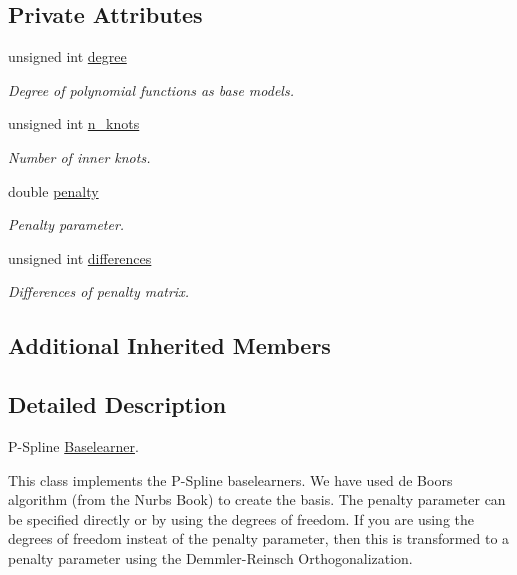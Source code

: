 \subsection*{Private Attributes}
\begin{DoxyCompactItemize}
\item 
unsigned int \hyperlink{classblearner_1_1_p_spline_blearner_a0f01c6609befd8af4d5a44f22293ba55}{degree}
\begin{DoxyCompactList}\small\item\em Degree of polynomial functions as base models. \end{DoxyCompactList}\item 
unsigned int \hyperlink{classblearner_1_1_p_spline_blearner_aac64be7a6b73d4dfc38dd892315ff4be}{n\+\_\+knots}
\begin{DoxyCompactList}\small\item\em Number of inner knots. \end{DoxyCompactList}\item 
double \hyperlink{classblearner_1_1_p_spline_blearner_ac456be9d0280c3b56ffb5bd5609910ab}{penalty}
\begin{DoxyCompactList}\small\item\em Penalty parameter. \end{DoxyCompactList}\item 
unsigned int \hyperlink{classblearner_1_1_p_spline_blearner_a93ea3a6c970521e14822d78f0f687ad4}{differences}
\begin{DoxyCompactList}\small\item\em Differences of penalty matrix. \end{DoxyCompactList}\end{DoxyCompactItemize}
\subsection*{Additional Inherited Members}


\subsection{Detailed Description}
P-\/\+Spline \hyperlink{classblearner_1_1_baselearner}{Baselearner}. 

This class implements the P-\/\+Spline baselearners. We have used de Boors algorithm (from the Nurbs Book) to create the basis. The penalty parameter can be specified directly or by using the degrees of freedom. If you are using the degrees of freedom insteat of the penalty parameter, then this is transformed to a penalty parameter using the Demmler-\/\+Reinsch Orthogonalization.

